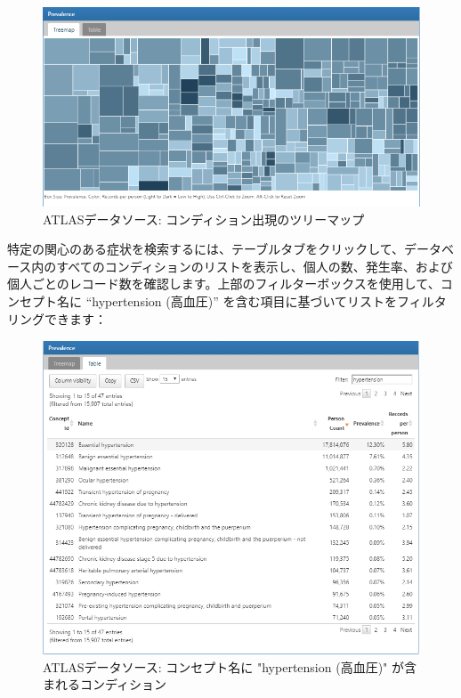 \documentclass[
  11pt]{book}
\theoremstyle{definition}
\theoremstyle{definition}
\theoremstyle{definition}
\theoremstyle{definition}
\theoremstyle{remark}
\begin{document}
\begin{figure}

{\centering \includegraphics[width=1\linewidth]{images/Characterization/atlasDataSourcesConditionTreemap} 

}

\caption{ATLASデータソース: コンディション出現のツリーマップ}\label{fig:atlasDataSourcesConditionTreemap}
\end{figure}

特定の関心のある症状を検索するには、テーブルタブをクリックして、データベース内のすべてのコンディションのリストを表示し、個人の数、発生率、および個人ごとのレコード数を確認します。上部のフィルターボックスを使用して、コンセプト名に ``hypertension (高血圧)'' を含む項目に基づいてリストをフィルタリングできます：

\begin{figure}

{\centering \includegraphics[width=1\linewidth]{images/Characterization/atlasDataSourcesConditionFiltered} 

}

\caption{ATLASデータソース: コンセプト名に "hypertension (高血圧)" が含まれるコンディション}\label{fig:atlasDataSourcesConditionFiltered}
\end{figure}
\end{document}
